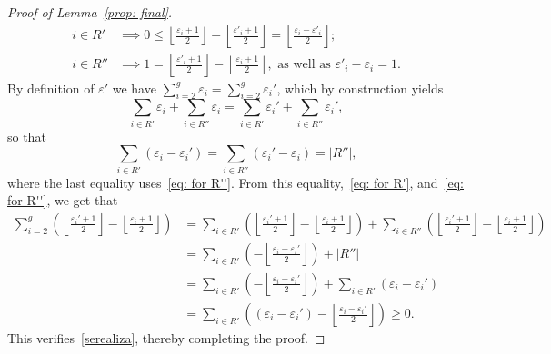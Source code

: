 \documentclass[amscd,amssymb,verbatim,10pt]{amsart}
\numberwithin{equation}{section}
\theoremstyle{plain}
\theoremstyle{definition}
\begin{document}
\begin{proof}[Proof of Lemma~\ref{prop: final}]
\begin{align}
i\in R'& \implies 0\leq\left\lfloor\frac{\varepsilon_i+1}{2}\right\rfloor-\left\lfloor\frac{\varepsilon'_i+1}{2}\right\rfloor=\left\lfloor\frac{\varepsilon_i-\varepsilon'_i}{2}\right\rfloor; \label{eq: for R'}
\\
i\in R''& \implies  1=\left\lfloor\frac{\varepsilon'_i+1}{2}\right\rfloor-\left\lfloor\frac{\varepsilon_i+1}{2}\right\rfloor, \text{ as well as } \varepsilon'_i-\varepsilon_i=1.\label{eq: for R''}
\end{align}
By definition of $\varepsilon'$ we have $\sum_{i=2}^g\varepsilon_i=\sum_{i=2}^g\varepsilon_i'$, which by construction yields
\begin{equation*}
    \sum_{i\in R'}\varepsilon_i+ \sum_{i\in R''}\varepsilon_i=\sum_{i\in R'}\varepsilon_i'+\sum_{i\in R''}\varepsilon_i',
\end{equation*}
so that
\[
\sum_{i\in R'}\left(\varepsilon_i-\varepsilon_i'\right)= \sum_{i\in R''}\left(\varepsilon_i'-\varepsilon_i\right)=|R''|,
\]
where the last equality uses~\eqref{eq: for R''}. From this equality,~\eqref{eq: for R'}, and~\eqref{eq: for R''}, we get that
\begin{align*}
\sum_{i=2}^g \left(\left\lfloor\frac{\varepsilon_i'+1}{2}\right\rfloor-\left\lfloor\frac{\varepsilon_i+1}{2}\right\rfloor\right) & = \sum_{i\in R'} \left(\left\lfloor\frac{\varepsilon_i'+1}{2}\right\rfloor-\left\lfloor\frac{\varepsilon_i+1}{2}\right\rfloor\right) + \sum_{i\in R''} \left(\left\lfloor\frac{\varepsilon_i'+1}{2}\right\rfloor-\left\lfloor\frac{\varepsilon_i+1}{2}\right\rfloor\right) 
\\ 
& =\sum_{i\in R'}\left(-\left\lfloor\frac{\varepsilon_i-\varepsilon_i'}{2}\right\rfloor\right)+|R''| 
\\ 
&= \sum_{i\in R'}\left(-\left\lfloor\frac{\varepsilon_i-\varepsilon_i'}{2}\right\rfloor\right)+\sum_{i\in R'}\left(\varepsilon_i-\varepsilon_i'\right) 
\\ 
&= \sum_{i\in R'}\left(\left(\varepsilon_i-\varepsilon_i'\right)-\left\lfloor\frac{\varepsilon_i-\varepsilon_i'}{2}\right\rfloor\right)\ge 0.
\end{align*}
This verifies~\eqref{serealiza}, thereby completing the proof. 
\end{proof}
\end{document}

